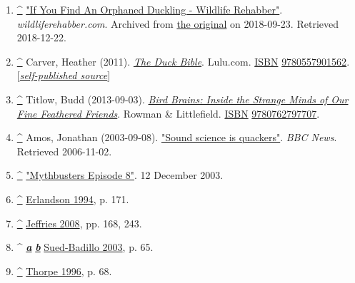 \documentclass[11pt,a4paper]{article}
\begin{document}
\begin{enumerate}
\item \href{\#cite\_ref-28}{\textbf{\textasciicircum{}}} \href{https://web.archive.org/web/20180923152911/http://wildliferehabber.com/content/if-you-find-duckling}{"If You Find An Orphaned Duckling - Wildlife Rehabber"}. \textit{wildliferehabber.com}. Archived from \href{https://wildliferehabber.com/content/if-you-find-duckling}{the original} on 2018-09-23. Retrieved 2018-12-22.
\item \href{\#cite\_ref-29}{\textbf{\textasciicircum{}}} Carver, Heather (2011). \href{https://books.google.com/books?id=VGofAwAAQBAJ\&q=mallard+sound+deep+and+raspy\&pg=PA39}{\textit{The Duck Bible}}. Lulu.com. \href{/wiki/ISBN\_\%28identifier\%29}{ISBN} \href{/wiki/Special:BookSources/9780557901562}{9780557901562}.[\href{/wiki/Wikipedia:Verifiability\#Self-published\_sources}{\textit{self-published source}}]
\item \href{\#cite\_ref-30}{\textbf{\textasciicircum{}}} Titlow, Budd (2013-09-03). \href{https://books.google.com/books?id=fXJBBAAAQBAJ\&q=Females+of+most+dabbling+ducks+make+the+classic+\%22quack\%22+sound+but+most+ducks+don\%27t+quack\&pg=PA123}{\textit{Bird Brains: Inside the Strange Minds of Our Fine Feathered Friends}}. Rowman \& Littlefield. \href{/wiki/ISBN\_\%28identifier\%29}{ISBN} \href{/wiki/Special:BookSources/9780762797707}{9780762797707}.
\item \href{\#cite\_ref-31}{\textbf{\textasciicircum{}}} Amos, Jonathan (2003-09-08). \href{http://news.bbc.co.uk/2/hi/science/nature/3086890.stm}{"Sound science is quackers"}. \textit{BBC News}. Retrieved 2006-11-02.
\item \href{\#cite\_ref-32}{\textbf{\textasciicircum{}}} \href{http://mythbustersresults.com/episode8}{"Mythbusters Episode 8"}. 12 December 2003.
\item \href{\#cite\_ref-FOOTNOTEErlandson1994171\_33-0}{\textbf{\textasciicircum{}}} \href{\#CITEREFErlandson1994}{Erlandson 1994}, p. 171.
\item \href{\#cite\_ref-FOOTNOTEJeffries2008168,\_243\_34-0}{\textbf{\textasciicircum{}}} \href{\#CITEREFJeffries2008}{Jeffries 2008}, pp. 168, 243.
\item \textasciicircum{} \href{\#cite\_ref-FOOTNOTESued-Badillo200365\_35-0}{\textit{\textbf{a}}} \href{\#cite\_ref-FOOTNOTESued-Badillo200365\_35-1}{\textit{\textbf{b}}} \href{\#CITEREFSued-Badillo2003}{Sued-Badillo 2003}, p. 65.
\item \href{\#cite\_ref-FOOTNOTEThorpe199668\_36-0}{\textbf{\textasciicircum{}}} \href{\#CITEREFThorpe1996}{Thorpe 1996}, p. 68.

\end{enumerate}
\end{document}
